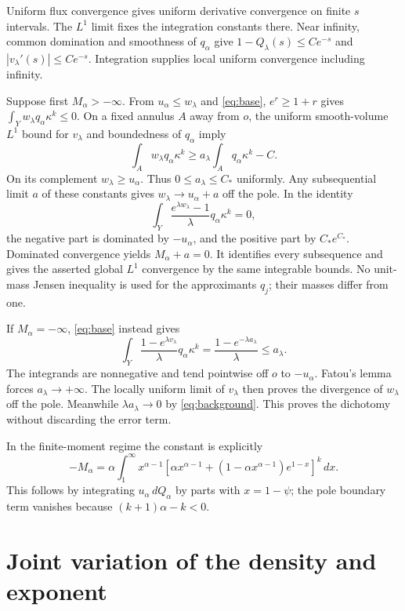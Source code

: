 \documentclass[11pt]{article}
\theoremstyle{remark}\newtheorem{remark}[theorem]{Remark}
\begin{document}
Uniform flux convergence gives uniform derivative convergence on finite
$s$ intervals. The $L^1$ limit fixes the integration constants there.
Near infinity, common domination and smoothness of $q_\alpha$ give
$1-Q_\lambda(s)\leq Ce^{-s}$ and $|v_\lambda'(s)|\leq Ce^{-s}$.
Integration supplies local uniform convergence including infinity.

Suppose first $M_\alpha>-\infty$. From $u_\alpha\leq w_\lambda$ and
\eqref{eq:base}, $e^r\geq1+r$ gives
$\int_Yw_\lambda q_\alpha\kappa^k\leq0$.
On a fixed annulus $A$ away from $o$, the uniform smooth-volume $L^1$
bound for $v_\lambda$ and boundedness of $q_\alpha$ imply
\[
 \int_Aw_\lambda q_\alpha\kappa^k
       \geq a_\lambda\int_Aq_\alpha\kappa^k-C.
\]
On its complement $w_\lambda\geq u_\alpha$.
Thus $0\leq a_\lambda\leq C_*$ uniformly. Any subsequential limit $a$
of these constants gives $w_\lambda\to u_\alpha+a$ off the pole.
In the identity
\[
 \int_Y\frac{e^{\lambda w_\lambda}-1}{\lambda}
                       q_\alpha\kappa^k=0,
\]
the negative part is dominated by $-u_\alpha$, and the positive part
by $C_*e^{C_*}$. Dominated convergence yields $M_\alpha+a=0$.
It identifies every subsequence and gives the asserted global $L^1$
convergence by the same integrable bounds.
No unit-mass Jensen inequality is used for the approximants $q_j$;
their masses differ from one.

If $M_\alpha=-\infty$, \eqref{eq:base} instead gives
\[
 \int_Y\frac{1-e^{\lambda v_\lambda}}{\lambda}
                q_\alpha\kappa^k
   =\frac{1-e^{-\lambda a_\lambda}}{\lambda}\leq a_\lambda.
\]
The integrands are nonnegative and tend pointwise off $o$ to
$-u_\alpha$. Fatou's lemma forces $a_\lambda\to+\infty$.
The locally uniform limit of $v_\lambda$ then proves the divergence
of $w_\lambda$ off the pole. Meanwhile $\lambda a_\lambda\to0$ by
\eqref{eq:background}. This proves the dichotomy without discarding
the error term.

In the finite-moment regime the constant is explicitly
\[
 -M_\alpha=\alpha\int_1^\infty x^{\alpha-1}
 \left[\alpha x^{\alpha-1}
       +(1-\alpha x^{\alpha-1})e^{1-x}\right]^k\,dx.
\]
This follows by integrating $u_\alpha\,dQ_\alpha$ by parts with
$x=1-\psi$; the pole boundary term vanishes because
$(k+1)\alpha-k<0$.

\section{Joint variation of the density and exponent}
\end{document}

